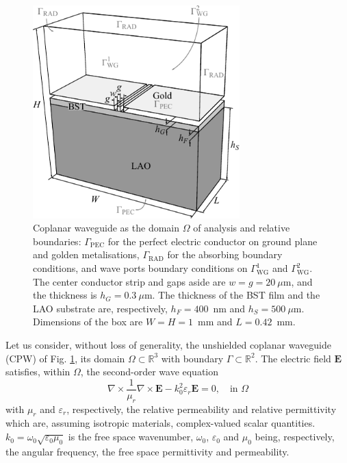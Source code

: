 \documentclass[journal,twoside,letterpaper]{IEEEtran}
\renewcommand{\vec}[1]{\mathbf{#1}}
\begin{document}
\label{sec:FE}
\begin{figure}[t!]
\centering
\includegraphics[width=8cm]{CPW}
\caption{Coplanar waveguide as the domain $\Omega$ of analysis and relative boundaries: $\Gamma_\text{PEC}$ for the perfect electric conductor on ground plane and golden metalisations, $\Gamma_\text{RAD}$ for the absorbing boundary conditions, and wave ports boundary conditions on $\Gamma_\text{WG}^1$ and $\Gamma_\text{WG}^2$. The center conductor strip and gaps aside are $w = g = 20~{\mu}$m, and the thickness is $h_G = 0.3~{\mu}$m. The thickness of the  BST film and the LAO substrate are, respectively, $h_F = 400$~nm and $h_S = 500~{\mu}$m. Dimensions of the box are $W = H = 1$~mm and $L=0.42$~mm.}
\label{fig:CPW}
\end{figure}

Let us consider, without loss of generality, the unshielded coplanar waveguide (CPW) of Fig. \ref{fig:CPW}, its domain $\Omega \subset \mathbb{R}^3$ with boundary $\Gamma \subset \mathbb{R}^2$.
%
The electric field $\vec{E}$ satisfies, within $\Omega$, the second-order wave equation \cite{Pelosi2009}
%
\begin{equation}
\label{eq:helmholtz}
\nabla \times \frac{1}{\mu_r} \nabla \times \vec{E} - {k}_0^2 {\varepsilon}_r \vec{E} = 0, \quad \text{in } \Omega
\end{equation}
%
\noindent with ${\mu}_r$ and ${\varepsilon}_r$, respectively, the relative permeability and relative permittivity which are, assuming isotropic materials, complex-valued scalar quantities. $k_0 = \omega_0\sqrt{\varepsilon_0\mu_0}$ is the free space wavenumber, $\omega_0$, $\varepsilon_0$ and $\mu_0$ being, respectively, the angular frequency, the free space permittivity and permeability.
\end{document}
